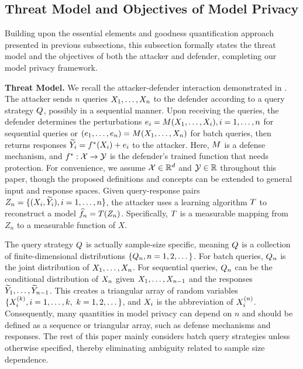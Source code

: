     \subsection{Threat Model and Objectives of Model Privacy}\label{subsec:game}
        Building upon the essential elements and goodness quantification approach presented in previous subsections, this subsection formally states the threat model and the objectives of both the attacker and defender, completing our model privacy framework.

        \textbf{Threat Model.}
        We recall the attacker-defender interaction demonstrated in . The attacker sends $n$ queries $X_1, \ldots, X_n$ to the defender according to a query strategy $Q$, possibly in a sequential manner. Upon receiving the queries, the defender determines the perturbations $e_i=M(X_1, \ldots, X_i), i=1,\dots,n$ for sequential queries or $(e_1, \dots, e_n)=M(X_1, \ldots, X_n)$ for batch queries, then returns responses $\widetilde{Y}_i = f^*(X_i)+e_i$ to the attacker. Here, $M$ is a defense mechanism, and $f^*: \mathcal{X}\to \mathcal{Y}$ is the defender's trained function that needs protection. For convenience, we assume $\mathcal{X} \in \mathbb{R}^d$ and $\mathcal{Y} \in \mathbb{R}$ throughout this paper, though the proposed definitions and concepts can be extended to general input and response spaces.
        Given query-response pairs $Z_n = \{(X_i, \widetilde{Y}_i), i=1,\ldots,n\}$, the attacker uses a learning algorithm $T$ to reconstruct a model $\widehat{f}_n=T(Z_n)$. Specifically, $T$ is a measurable mapping from $Z_n$ to a measurable function of $X$. 

        \begin{remark}
        The query strategy $Q$ is actually sample-size specific, meaning $Q$ is a collection of finite-dimensional distributions $\{Q_n, n=1,2,\dots\}$.  
        For batch queries, $Q_n$ is the joint distribution of $X_1, \dots, X_n$. For sequential queries, $Q_n$ can be the conditional distribution of $X_n$ given $X_1,\dots, X_{n-1}$ and the responses $\widetilde{Y}_1,\dots,\widetilde{Y}_{n-1}$. 
        This creates a triangular array of random variables $\{X_i^{(k)}, i=1,\dots, k, \ k=1,2,\dots \}$, and $X_i$ is the abbreviation of $X_i^{(n)}$. 
        Consequently, many quantities in model privacy can depend on $n$ and should be defined as a sequence or triangular array, such as defense mechanisms and responses. The rest of this paper mainly considers batch query strategies unless otherwise specified, thereby eliminating ambiguity related to sample size dependence.
        \end{remark}

